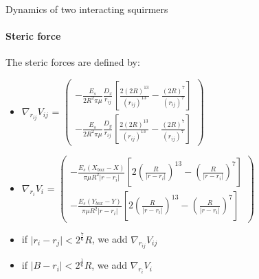 \documentclass{beamer}
\begin{document}
\begin{frame}{Dynamics of two interacting squirmers}
    \framesubtitle{Steric force}
    The steric forces are defined by: 
    \begin{itemize}
        \item $\nabla_{r_{ij}} V_{ij}$ = 
        $\begin{pmatrix}
            -\frac{E_s}{2R^2\pi\mu} \frac{D_x}{r_{ij}}\left[ \frac{2(2R)^{13}}{(r_{ij})^{13}} - \frac{(2R)^7}{(r_{ij})^7} \right] \\
            -\frac{E_s}{2R^2\pi\mu} \frac{D_y}{r_{ij}}\left[ \frac{2(2R)^{13}}{(r_{ij})^{13}} - \frac{(2R)^7}{(r_{ij})^7} \right]
        \end{pmatrix}$
        \item $\nabla_{r_i} V_i$ = $\begin{pmatrix}
            - \frac{E_s (X_{box}-X)}{\pi\mu R^2 \lvert r - r_i \rvert } \left[ 2 \left( \frac{R}{\lvert r-r_i\rvert} \right)^{13} - \left( \frac{R}{\lvert r-r_i\rvert}\right)^7 \right] \\
            - \frac{E_s (Y_{box}-Y)}{\pi\mu R^2 \lvert r - r_i \rvert } \left[ 2 \left( \frac{R}{\lvert r-r_i\rvert} \right)^{13} - \left( \frac{R}{\lvert r-r_i\rvert}\right)^7 \right]
        \end{pmatrix}$
    \end{itemize}
    \begin{itemize}
        \item if $\lvert r_i-r_j\rvert < 2^{\frac{7}{6}}R$, we add $\nabla_{r_{ij}}V_{ij}$
        \item if $\lvert B-r_i\rvert < 2^{\frac{1}{6}}R$, we add $\nabla_{r_{i}}V_{i}$
    \end{itemize}
\end{frame}
    
\end{document}
